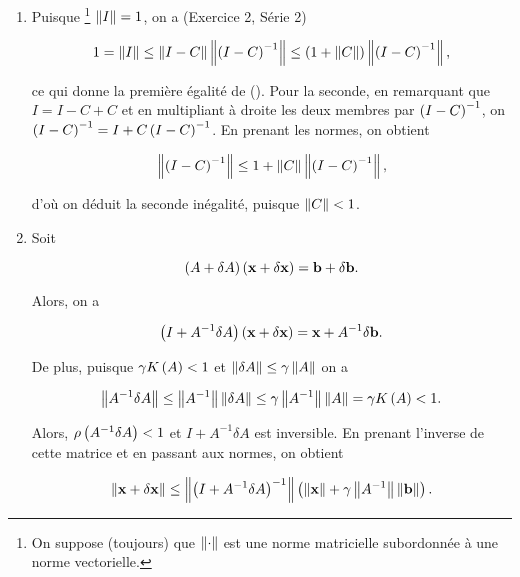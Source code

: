 \begin{enumerate}
  \item Puisque \footnote{On suppose (toujours) que $\left\lVert\cdot\right\rVert$ est une norme matricielle subordonnée à une norme vectorielle.} $\left\lVert I\right\rVert = 1$, on a (Exercice 2, Série 2)
  
  \begin{equation*}
    1 = \left\lVert I\right\rVert
    \leq \left\lVert I - C\right\rVert \left\lVert\left(I - C\right)^{-1}\right\rVert
    \leq \left(1 + \left\lVert C\right\rVert\right) \left\lVert\left(I - C\right)^{-1}\right\rVert,
  \end{equation*}
  
  ce qui donne la première égalité de ().
  Pour la seconde, en remarquant que $I = I - C + C$ et en multipliant à droite les deux membres par $\left(I - C\right)^{-1}$, on $\left(I - C\right)^{-1} = I + C \left(I - C\right)^{-1}$.
  En prenant les normes, on obtient
  
  \begin{equation*}
    \left\lVert\left(I - C\right)^{-1}\right\rVert \leq 1 + \left\lVert C\right\rVert \left\lVert\left(I - C\right)^{-1}\right\rVert,
  \end{equation*}
  
  d'où on déduit la seconde inégalité, puisque $\left\lVert C\right\rVert < 1$.
  
  \item Soit
  
  \begin{equation*}
    \left(A + \delta A\right) \left(\mathbf{x} + \delta \mathbf{x}\right) = \mathbf{b} + \delta \mathbf{b}.
  \end{equation*}
  
  Alors, on a
  
  \begin{equation*}
    \left(I + A^{-1} \delta A\right) \left(\mathbf{x} + \delta \mathbf{x}\right) = \mathbf{x} + A^{-1} \delta \mathbf{b}.
  \end{equation*}
  
  De plus, puisque $\gamma K \left(A\right) < 1$ et $\left\lVert\delta A\right\rVert \leq \gamma \left\lVert A\right\rVert$ on a 
  
  \begin{equation*}
    \left\lVert A^{-1} \delta A\right\rVert
    \leq \left\lVert A^{-1}\right\rVert \left\lVert\delta A\right\rVert
    \leq \gamma \left\lVert A^{-1}\right\rVert \left\lVert A\right\rVert
    = \gamma K \left(A\right) < 1.
  \end{equation*}
  
  Alors, $\rho \left(A^{-1} \delta A\right) < 1$ et $I + A^{-1} \delta A$ est inversible.
  En prenant l'inverse de cette matrice et en passant aux normes, on obtient
  
  \begin{equation*}
    \left\lVert\mathbf{x} + \delta \mathbf{x}\right\rVert
    \leq \left\lVert\left(I + A^{-1} \delta A\right)^{-1}\right\rVert \left(\left\lVert\mathbf{x}\right\rVert + \gamma \left\lVert A^{-1}\right\rVert \left\lVert\mathbf{b}\right\rVert\right).
  \end{equation*}
  

\end{enumerate}
